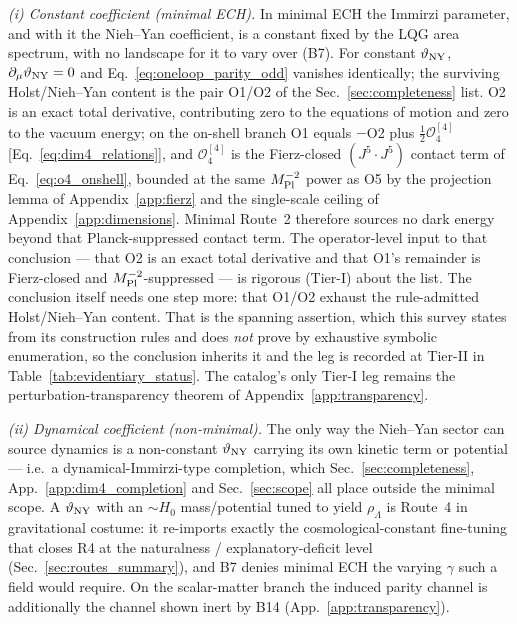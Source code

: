 \documentclass[aps,prd,twocolumn,superscriptaddress,showpacs,preprintnumbers,nofootinbib,longbibliography,floatfix]{revtex4-2}
\newcommand{\MPl}{M_{\rm Pl}}
\begin{document}
\emph{(i) Constant coefficient (minimal ECH).} In minimal ECH the Immirzi
parameter, and with it the Nieh--Yan coefficient, is a constant fixed by
the LQG area spectrum, with no landscape for it to vary over (B7). For
constant $\vartheta_{\rm NY}$, $\partial_\mu\vartheta_{\rm NY}=0$ and
Eq.~\eqref{eq:oneloop_parity_odd} vanishes identically; the surviving
Holst/Nieh--Yan content is the pair O1/O2 of the
Sec.~\ref{sec:completeness} list. O2 is an exact total derivative,
contributing zero to the equations of motion and zero to the vacuum
energy; on the on-shell branch O1 equals $-$O2 plus
$\tfrac12\mathcal{O}_4^{[4]}$ [Eq.~\eqref{eq:dim4_relations}], and
$\mathcal{O}_4^{[4]}$ is the Fierz-closed
$(J^5\!\cdot\!J^5)$ contact term of Eq.~\eqref{eq:o4_onshell}, bounded at
the same $\MPl^{-2}$ power as O5 by the projection lemma of
Appendix~\ref{app:fierz} and the single-scale ceiling of
Appendix~\ref{app:dimensions}. Minimal Route~2 therefore sources no dark
energy beyond that Planck-suppressed contact term. The
operator-level input to that conclusion --- that O2 is an exact total
derivative and that O1's remainder is Fierz-closed and
$\MPl^{-2}$-suppressed --- is rigorous (Tier-I) about the list. The conclusion
itself needs one step more: that O1/O2 exhaust the rule-admitted
Holst/Nieh--Yan content. That is the spanning assertion, which this
survey states from its construction rules and does \emph{not} prove by
exhaustive symbolic enumeration, so the conclusion inherits it and the
leg is recorded at Tier-II in
Table~\ref{tab:evidentiary_status}. The catalog's only Tier-I leg remains
the perturbation-transparency theorem of
Appendix~\ref{app:transparency}.

\emph{(ii) Dynamical coefficient (non-minimal).} The only way the
Nieh--Yan sector can source dynamics is a non-constant
$\vartheta_{\rm NY}$ carrying its own kinetic term or potential --- i.e.\
a dynamical-Immirzi-type completion, which Sec.~\ref{sec:completeness},
App.~\ref{app:dim4_completion} and Sec.~\ref{sec:scope} all place outside
the minimal scope. A $\vartheta_{\rm NY}$ with an $\sim\!H_0$
mass/potential tuned to yield $\rho_\Lambda$ is Route~4 in gravitational
costume: it re-imports exactly the cosmological-constant fine-tuning that
closes R4 at the naturalness / explanatory-deficit level
(Sec.~\ref{sec:routes_summary}), and B7 denies minimal ECH the varying
$\gamma$ such a field would require. On the scalar-matter branch the
induced parity channel is additionally the channel shown inert by B14
(App.~\ref{app:transparency}).
\end{document}
